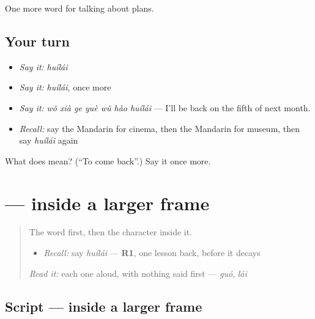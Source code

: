 \begin{grammarlens}[title={What you've built}]
One more word for talking about plans.
\end{grammarlens}

\subsection*{Your turn}
\begin{itemize}
\raggedright
  \item \emph{Say it:} \emph{huílái}
  \item \emph{Say it:} \emph{huílái}, once more
  \item \emph{Say it:} \emph{wǒ xià ge yuè wǔ hào huílái} — I'll be back on the fifth of next month.
  \item \emph{Recall:} say the Mandarin for cinema, then the Mandarin for museum, then say \emph{huílái} again
\end{itemize}

\begin{tcolorbox}[breakable,colback=teal!4,colframe=teal!35!black,title={Before you move on}]
What does  mean? (\textquotedblleft{}To come back\textquotedblright{}.) Say it once more.
\end{tcolorbox}
\section[\texorpdfstring{\zh{回} (huí)}{回 (huí)}]{ —  inside a larger frame}

\label{lesson:ZH-W191-hui-return}



\begin{quote}
The word first, then the character inside it.

\begin{itemize}
\raggedright
  \item \emph{Recall:} say \emph{huílái} — \textbf{R1}, one lesson back, before it decays
\end{itemize}

\begin{quote}
 
\end{quote}

\emph{Read it:} each one aloud, with nothing said first — \emph{guó}, \emph{lái}
\end{quote}

\subsection*{Script —  inside a larger frame}

